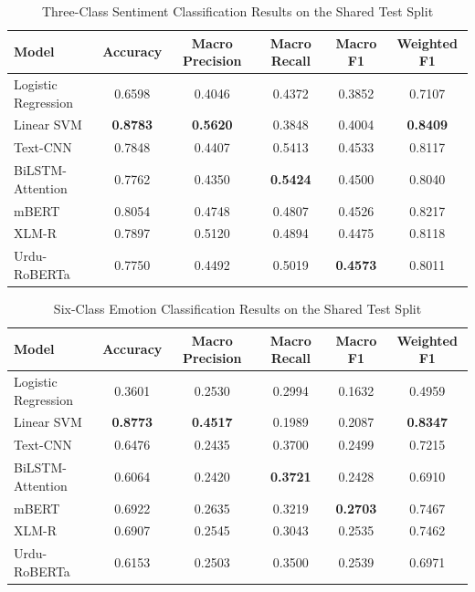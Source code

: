 \begin{table}[t]
\caption{Three-Class Sentiment Classification Results on the Shared Test Split}
\label{tab:sentiment-results}
\centering
\footnotesize
\setlength{\tabcolsep}{7pt}
\begin{tabular}{lccccc}
\toprule
Model & Accuracy & Macro Precision & Macro Recall & Macro F1 & Weighted F1 \\
\midrule
Logistic Regression & 0.6598 & 0.4046 & 0.4372 & 0.3852 & 0.7107 \\
Linear SVM          & \textbf{0.8783} & \textbf{0.5620} & 0.3848 & 0.4004 & \textbf{0.8409} \\
Text-CNN            & 0.7848 & 0.4407 & 0.5413 & 0.4533 & 0.8117 \\
BiLSTM-Attention    & 0.7762 & 0.4350 & \textbf{0.5424} & 0.4500 & 0.8040 \\
mBERT               & 0.8054 & 0.4748 & 0.4807 & 0.4526 & 0.8217 \\
XLM-R               & 0.7897 & 0.5120 & 0.4894 & 0.4475 & 0.8118 \\
Urdu-RoBERTa        & 0.7750 & 0.4492 & 0.5019 & \textbf{0.4573} & 0.8011 \\
\bottomrule
\end{tabular}
\end{table}

\begin{table}[t]
\caption{Six-Class Emotion Classification Results on the Shared Test Split}
\label{tab:emotion-results}
\centering
\footnotesize
\setlength{\tabcolsep}{7pt}
\begin{tabular}{lccccc}
\toprule
Model & Accuracy & Macro Precision & Macro Recall & Macro F1 & Weighted F1 \\
\midrule
Logistic Regression & 0.3601 & 0.2530 & 0.2994 & 0.1632 & 0.4959 \\
Linear SVM          & \textbf{0.8773} & \textbf{0.4517} & 0.1989 & 0.2087 & \textbf{0.8347} \\
Text-CNN            & 0.6476 & 0.2435 & 0.3700 & 0.2499 & 0.7215 \\
BiLSTM-Attention    & 0.6064 & 0.2420 & \textbf{0.3721} & 0.2428 & 0.6910 \\
mBERT               & 0.6922 & 0.2635 & 0.3219 & \textbf{0.2703} & 0.7467 \\
XLM-R               & 0.6907 & 0.2545 & 0.3043 & 0.2535 & 0.7462 \\
Urdu-RoBERTa        & 0.6153 & 0.2503 & 0.3500 & 0.2539 & 0.6971 \\
\bottomrule
\end{tabular}
\end{table}
